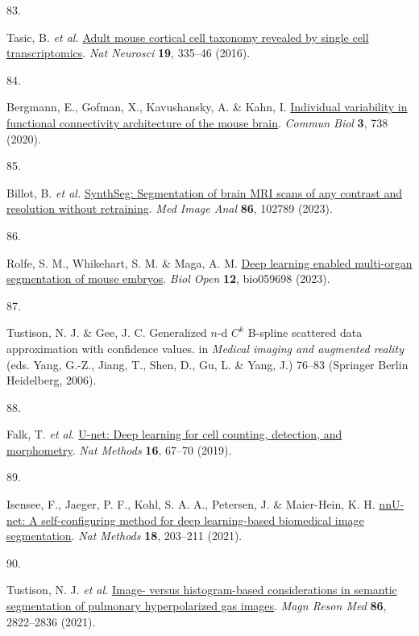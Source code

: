 \documentclass[
  12pt,
]{article}
\newlength{\cslhangindent}
\newlength{\csllabelwidth}
\newenvironment{CSLReferences}[2] %
 {\begin{list}{}{%
  \setlength{\itemindent}{0pt}
  \setlength{\leftmargin}{0pt}
  \setlength{\parsep}{0pt}
  \ifodd #1
   \setlength{\leftmargin}{\cslhangindent}
   \setlength{\itemindent}{-1\cslhangindent}
  \fi
  \setlength{\itemsep}{#2\baselineskip}}}
 {\end{list}}
\newcommand{\CSLLeftMargin}[1]{\parbox[t]{\csllabelwidth}{\strut#1\strut}}
\newcommand{\CSLRightInline}[1]{\parbox[t]{\linewidth - \csllabelwidth}{\strut#1\strut}}
\begin{document}
\begin{CSLReferences}{0}{0}
\CSLLeftMargin{83. }%
\CSLRightInline{Tasic, B. \emph{et al.}
\href{https://doi.org/10.1038/nn.4216}{Adult mouse cortical cell
taxonomy revealed by single cell transcriptomics}. \emph{Nat Neurosci}
\textbf{19}, 335--46 (2016).}

\CSLLeftMargin{84. }%
\CSLRightInline{Bergmann, E., Gofman, X., Kavushansky, A. \& Kahn, I.
\href{https://doi.org/10.1038/s42003-020-01472-5}{Individual variability
in functional connectivity architecture of the mouse brain}.
\emph{Commun Biol} \textbf{3}, 738 (2020).}

\CSLLeftMargin{85. }%
\CSLRightInline{Billot, B. \emph{et al.}
\href{https://doi.org/10.1016/j.media.2023.102789}{SynthSeg:
Segmentation of brain MRI scans of any contrast and resolution without
retraining}. \emph{Med Image Anal} \textbf{86}, 102789 (2023).}

\CSLLeftMargin{86. }%
\CSLRightInline{Rolfe, S. M., Whikehart, S. M. \& Maga, A. M.
\href{https://doi.org/10.1242/bio.059698}{Deep learning enabled
multi-organ segmentation of mouse embryos}. \emph{Biol Open}
\textbf{12}, bio059698 (2023).}

\CSLLeftMargin{87. }%
\CSLRightInline{Tustison, N. J. \& Gee, J. C. Generalized \(n\)-d
\(C^k\) {B}-spline scattered data approximation with confidence values.
in \emph{Medical imaging and augmented reality} (eds. Yang, G.-Z.,
Jiang, T., Shen, D., Gu, L. \& Yang, J.) 76--83 (Springer Berlin
Heidelberg, 2006).}

\CSLLeftMargin{88. }%
\CSLRightInline{Falk, T. \emph{et al.}
\href{https://doi.org/10.1038/s41592-018-0261-2}{U-net: Deep learning
for cell counting, detection, and morphometry}. \emph{Nat Methods}
\textbf{16}, 67--70 (2019).}

\CSLLeftMargin{89. }%
\CSLRightInline{Isensee, F., Jaeger, P. F., Kohl, S. A. A., Petersen, J.
\& Maier-Hein, K. H.
\href{https://doi.org/10.1038/s41592-020-01008-z}{nnU-net: A
self-configuring method for deep learning-based biomedical image
segmentation}. \emph{Nat Methods} \textbf{18}, 203--211 (2021).}

\CSLLeftMargin{90. }%
\CSLRightInline{Tustison, N. J. \emph{et al.}
\href{https://doi.org/10.1002/mrm.28908}{Image- versus histogram-based
considerations in semantic segmentation of pulmonary hyperpolarized gas
images}. \emph{Magn Reson Med} \textbf{86}, 2822--2836 (2021).}

\end{CSLReferences}
\end{document}
